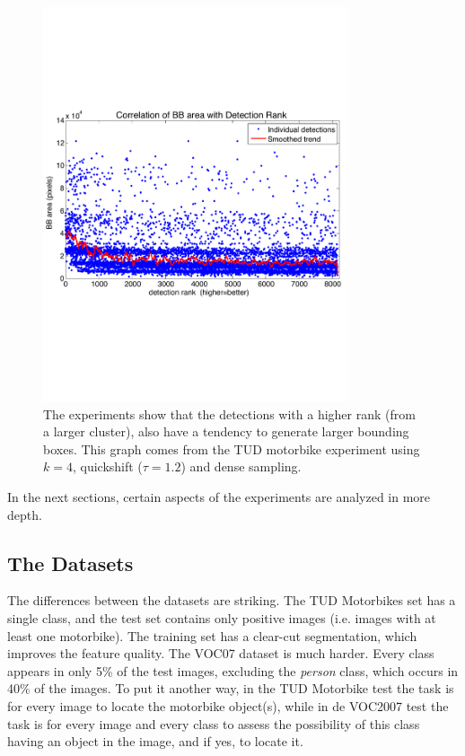 \begin{figure}[hbt]
    \centering
    \includegraphics[width=0.8\textwidth]{BBSizeVsRank}
    \caption{The experiments show that the detections with a higher rank (from a larger cluster), also have a tendency to generate larger bounding boxes. This graph comes from the TUD motorbike experiment using $k=4$, quickshift ($\tau=1.2$) and dense sampling.}
    \label{fig:bbsizevsrank}
\end{figure}

In the next sections, certain aspects of the experiments are analyzed in more depth.

\subsection{The Datasets} %
\label{sec:the_dataset}

The differences between the datasets are striking. The TUD Motorbikes set has a single class, and the test set contains only positive images (i.e. images with at least one motorbike). The training set has a clear-cut segmentation, which improves the feature quality. The VOC07 dataset is much harder. Every class appears in only 5\% of the test images, excluding the \emph{person} class, which occurs in 40\% of the images. To put it another way, in the TUD Motorbike test the task is for every image to locate the motorbike object(s), while in de VOC2007 test the task is for every image and every class to assess the possibility of this class having an object in the image, and if yes, to locate it.

